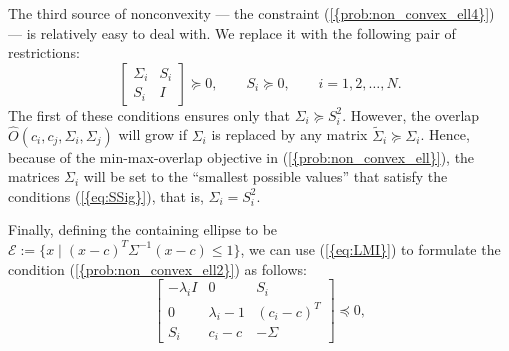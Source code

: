 \documentclass{siamltex}
\begin{document}
The third source of nonconvexity --- the constraint
{(\ref{{prob:non_convex_ell4}})} --- is relatively easy to deal with. We
replace it with the following pair of restrictions:
\begin{equation} \label{eq:SSig} 
\left[ \begin{matrix} \Sigma_i & S_i \\ S_i &
    I \end{matrix} \right] \succeq 0, \qquad S_i \succeq 0, \qquad
i=1,2,\dotsc,N.  
\end{equation}
The first of these conditions ensures only that $\Sigma_i \succeq
S_i^2$. However,
the overlap $\hat{O}(c_i,c_j,\Sigma_i,\Sigma_j)$ will grow if
$\Sigma_i$ is replaced by any matrix $\tilde{\Sigma}_i \succeq
\Sigma_i$. Hence, because of the min-max-overlap objective in
{(\ref{{prob:non_convex_ell}})}, the matrices $\Sigma_i$ will be set to
the ``smallest possible values'' that satisfy the conditions
{(\ref{{eq:SSig}})}, that is, $\Sigma_i = S_i^2$.

Finally, defining the containing ellipse to be $\mathcal{E} := \{ x
\mid (x-c)^T \Sigma^{-1} (x-c) \le 1 \}$, we can use {(\ref{{eq:LMI}})} to
formulate the condition {(\ref{{prob:non_convex_ell2}})} as follows:
\begin{equation} \label{eq:EiE} 
\left[ \begin{matrix} - \lambda_i I &0&S_i\\
0& \lambda_i-1&(c_i-c)^T\\ 
S_i &c_i-c&-\Sigma \end{matrix} \right] \preceq 0,
\end{equation}
\end{document}
